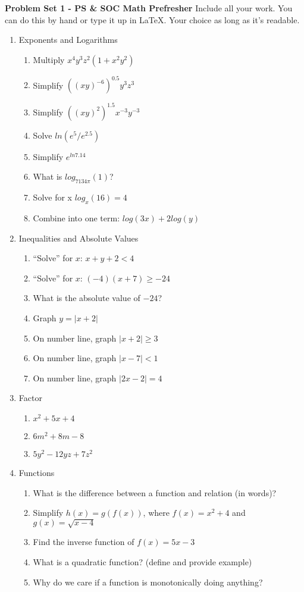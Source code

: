 \documentclass[11pt]{article}
\begin{document}
\noindent \textbf{Problem Set 1 - PS \& SOC Math Prefresher }
Include all your work. You can do this by hand or type it up in \LaTeX . Your choice as long as it's readable. 

\begin{enumerate}
\item Exponents and Logarithms
\begin{enumerate}
\item Multiply $x^4 y^3 z^2 (1 + x^2 y^2)$
\item Simplify $((xy)^{-6})^{0.5} y^3z^{3}$
\item Simplify $((xy)^2)^{1.5} x^{-3}y^{-3}$
\item Solve $ln(e^5/e^{2.5})$
\item Simplify $e^{ln 7.14}$
\item What is $log_{7134\pi}(1)$?
\item Solve for x $log_x(16)=4$ %
\item Combine into one term: $log(3x)+2log(y)$ %
\end{enumerate}

\item Inequalities and Absolute Values
\begin{enumerate}
\item ``Solve'' for $x$: $x + y +2 < 4$
\item ``Solve'' for $x$: $(-4)(x + 7) \geq -24$
\item What is the absolute value of $-24$?
\item Graph $y = |x +2|$
\item On number line, graph $|x + 2| \geq 3$
\item On number line, graph $|x - 7| < 1$
\item On number line, graph $|2x - 2| = 4$
\end{enumerate}

\item Factor
\begin{enumerate}
\item $x^2+ 5x+4$
\item $6m^2+8m-8$ 
\item $5y^2-12yz+7z^2$ 
\end{enumerate}

\item Functions
\begin{enumerate}
\item What is the difference between a function and relation (in words)?
\item Simplify $h(x)=g(f(x))$, where $f(x)=x^2+4$ and $g(x)=\sqrt{x-4}$ %
\item Find the inverse function of $f(x)=5x-3$ %
\item What is a quadratic function? (define and provide example) %
\item Why do we care if a function is monotonically doing anything?
\end{enumerate}


\end{enumerate}
\end{document}

